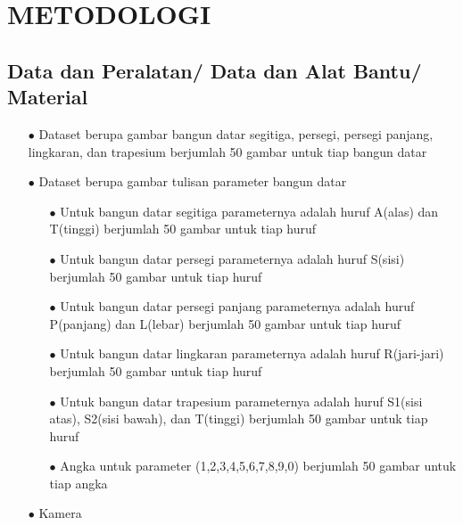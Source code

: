 \section{METODOLOGI}


\subsection{Data dan Peralatan/ Data dan Alat Bantu/ Material }

\begin{itemize}
   \item [$\bullet$]Dataset berupa gambar bangun datar segitiga, persegi, persegi panjang, lingkaran, dan trapesium berjumlah 50 gambar untuk tiap bangun datar
   

   \item [$\bullet$]Dataset berupa gambar tulisan parameter bangun datar 
    \begin{itemize}
      \item [$\bullet$]Untuk bangun datar segitiga parameternya adalah huruf A(alas) dan T(tinggi) berjumlah 50 gambar untuk tiap huruf
      \item [$\bullet$]Untuk bangun datar persegi parameternya adalah huruf S(sisi) berjumlah 50 gambar untuk tiap huruf
      \item [$\bullet$]Untuk bangun datar persegi panjang parameternya adalah huruf P(panjang) dan L(lebar) berjumlah 50 gambar untuk tiap huruf
      \item [$\bullet$]Untuk bangun datar lingkaran parameternya adalah huruf R(jari-jari) berjumlah 50 gambar untuk tiap huruf
      \item [$\bullet$]Untuk bangun datar trapesium parameternya adalah huruf S1(sisi atas), S2(sisi bawah), dan T(tinggi) berjumlah 50 gambar untuk tiap huruf
      \item [$\bullet$]Angka untuk parameter (1,2,3,4,5,6,7,8,9,0) berjumlah 50 gambar untuk tiap angka
    \end{itemize}

   \item [$\bullet$]Kamera \\
   
\end{itemize}
   

